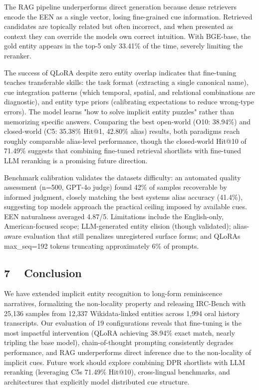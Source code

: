 \documentclass[
]{article}
\begin{document}
The RAG pipeline underperforms direct generation because dense
retrievers encode the EEN as a single vector, losing fine-grained cue
information. Retrieved candidates are topically related but often
incorrect, and when presented as context they can override the
model\textquotesingle s own correct intuition. With BGE-base, the gold
entity appears in the top-5 only 33.41\% of the time, severely limiting
the reranker.

The success of QLoRA despite zero entity overlap indicates that
fine-tuning teaches transferable skills: the task format (extracting a
single canonical name), cue integration patterns (which temporal,
spatial, and relational combinations are diagnostic), and entity type
priors (calibrating expectations to reduce wrong-type errors). The model
learns "how to solve implicit entity puzzles" rather than memorizing
specific answers. Comparing the best open-world (O10: 38.94\%) and
closed-world (C5: 35.38\% Hit@1, 42.80\% alias) results, both paradigms
reach roughly comparable alias-level performance, though the
closed-world Hit@10 of 71.49\% suggests that combining fine-tuned
retrieval shortlists with fine-tuned LLM reranking is a promising future
direction.

Benchmark calibration validates the dataset\textquotesingle s
difficulty: an automated quality assessment (n=500, GPT-4o judge) found
42\% of samples recoverable by informed judgment, closely matching the
best system\textquotesingle s alias accuracy (41.4\%), suggesting top
models approach the practical ceiling imposed by available cues. EEN
naturalness averaged 4.87/5. Limitations include the English-only,
American-focused scope; LLM-generated entity elision (though validated);
alias-aware evaluation that still penalizes unregistered surface forms;
and QLoRA\textquotesingle s max\_seq=192 tokens truncating approximately
6\% of prompts.

\subsection{7 ~ Conclusion}\label{conclusion}

We have extended implicit entity recognition to long-form reminiscence
narratives, formalizing the non-locality property and releasing
IRC-Bench with 25,136 samples from 12,337 Wikidata-linked entities
across 1,994 oral history transcripts. Our evaluation of 19
configurations reveals that fine-tuning is the most impactful
intervention (QLoRA achieving 38.94\% exact match, nearly tripling the
base model), chain-of-thought prompting consistently degrades
performance, and RAG underperforms direct inference due to the
non-locality of implicit cues. Future work should explore combining DPR
shortlists with LLM reranking (leveraging C5\textquotesingle s 71.49\%
Hit@10), cross-lingual benchmarks, and architectures that explicitly
model distributed cue structure.
\end{document}
